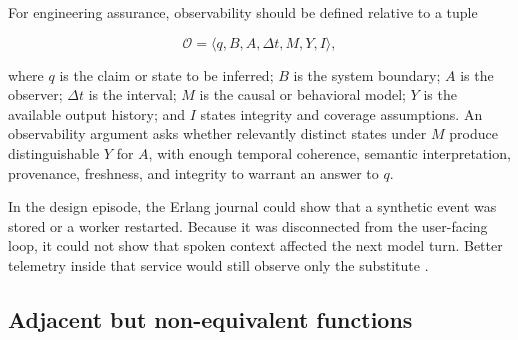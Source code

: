 \documentclass[10pt,a4paper]{article}
\begin{document}
For engineering assurance, observability should be defined relative to a tuple

\begin{equation}
\mathcal{O}=\langle q, B, A, \Delta t, M, Y, I \rangle,
\end{equation}

where $q$ is the claim or state to be inferred; $B$ is the system boundary; $A$ is the observer; $\Delta t$ is the interval; $M$ is the causal or behavioral model; $Y$ is the available output history; and $I$ states integrity and coverage assumptions. An observability argument asks whether relevantly distinct states under $M$ produce distinguishable $Y$ for $A$, with enough temporal coherence, semantic interpretation, provenance, freshness, and integrity to warrant an answer to $q$.

In the design episode, the Erlang journal could show that a synthetic event was stored or a worker restarted. Because it was disconnected from the user-facing loop, it could not show that spoken context affected the next model turn. Better telemetry inside that service would still observe only the substitute \cite{daybreakblind,daybreakguided}.

\subsection{Adjacent but non-equivalent functions}
\end{document}
